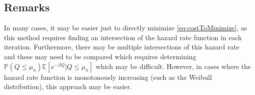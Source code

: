 \subsection{Remarks}
In many cases, it may be easier just to directly minimize \eqref{eq:costToMinimize}, as this method requires finding an intersection of the hazard rate function in each iteration.
Furthermore, there may be multiple intersections of this hazard rate and these may need to be compared which requires determining $\mathbb{P}(Q\leq \mu_n)\mathbb{E}[e^{-\beta Q}|Q\leq \mu_n]$ which may be difficult.
However, in cases where the hazard rate function is monotonously increasing (such as the Weibull distribution), this approach may be easier.
